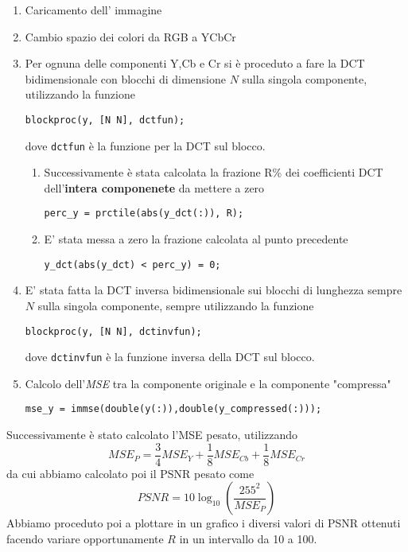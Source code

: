 \begin{enumerate}
    \item Caricamento dell' immagine
    \item Cambio spazio dei colori da RGB a YCbCr
    \item Per ognuna delle componenti Y,Cb e Cr si è proceduto a fare la DCT bidimensionale con blocchi di dimensione $N$ sulla singola componente, utilizzando la funzione \begin{lstlisting}[frame=single,style=Matlab-editor]
blockproc(y, [N N], dctfun);
        \end{lstlisting}dove \texttt{dctfun} è la funzione per la DCT sul blocco.
    \begin{enumerate}
        \item Successivamente è stata calcolata la frazione R\% dei coefficienti DCT dell'\textbf{intera componenete} da mettere a zero 
        \begin{lstlisting}[frame=single,style=Matlab-editor]
perc_y = prctile(abs(y_dct(:)), R);
        \end{lstlisting}
        \item E' stata messa a zero la frazione calcolata al punto precedente \begin{lstlisting}[frame=single,style=Matlab-editor]
y_dct(abs(y_dct) < perc_y) = 0;
        \end{lstlisting}
    \end{enumerate}
    \item E' stata fatta la DCT inversa bidimensionale sui blocchi di lunghezza sempre $N$ sulla singola componente, sempre utilizzando la funzione \begin{lstlisting}[frame=single,style=Matlab-editor]
blockproc(y, [N N], dctinvfun);
        \end{lstlisting} dove \texttt{dctinvfun} è la funzione inversa della DCT sul blocco.
    \item Calcolo dell'\textit{MSE} tra la componente originale e la componente "compressa" \begin{lstlisting}[frame=single,style=Matlab-editor]
mse_y = immse(double(y(:)),double(y_compressed(:)));
    \end{lstlisting}
\end{enumerate}
Successivamente è stato calcolato l'MSE pesato, utilizzando
\begin{equation}
    {MSE}_P = \frac3 4 {MSE}_Y + \frac 1 8 {MSE}_{Cb} + \frac 1 8 {MSE}_{Cr}
\end{equation}
da cui abbiamo calcolato poi il PSNR pesato come
\begin{equation}
    PSNR=10\log_{10} \left(\frac{255^2}{{MSE}_P}\right)
\end{equation}
Abbiamo proceduto poi a plottare in un grafico i diversi valori di PSNR ottenuti facendo variare opportunamente $R$ in un intervallo da 10 a 100.